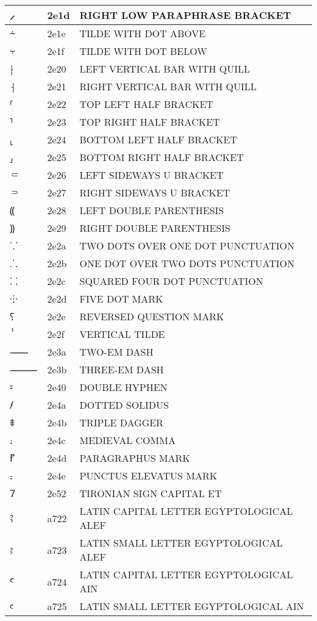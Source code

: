 \documentclass[12pt,letterpaper,openany]{book}
\begin{document}
\begin{center}
\begin{supertabular}{|m{0.25in}|m{0.5in}|m{4in}|}
⸝ & 2e1d & RIGHT LOW PARAPHRASE BRACKET\\\hline
⸞ & 2e1e & TILDE WITH DOT ABOVE\\\hline
⸟ & 2e1f & TILDE WITH DOT BELOW\\\hline
⸠ & 2e20 & LEFT VERTICAL BAR WITH QUILL\\\hline
⸡ & 2e21 & RIGHT VERTICAL BAR WITH QUILL\\\hline
⸢ & 2e22 & TOP LEFT HALF BRACKET\\\hline
⸣ & 2e23 & TOP RIGHT HALF BRACKET\\\hline
⸤ & 2e24 & BOTTOM LEFT HALF BRACKET\\\hline
⸥ & 2e25 & BOTTOM RIGHT HALF BRACKET\\\hline
⸦ & 2e26 & LEFT SIDEWAYS U BRACKET\\\hline
⸧ & 2e27 & RIGHT SIDEWAYS U BRACKET\\\hline
⸨ & 2e28 & LEFT DOUBLE PARENTHESIS\\\hline
⸩ & 2e29 & RIGHT DOUBLE PARENTHESIS\\\hline
⸪ & 2e2a & TWO DOTS OVER ONE DOT PUNCTUATION\\\hline
⸫ & 2e2b & ONE DOT OVER TWO DOTS PUNCTUATION\\\hline
⸬ & 2e2c & SQUARED FOUR DOT PUNCTUATION\\\hline
⸭ & 2e2d & FIVE DOT MARK\\\hline
⸮ & 2e2e & REVERSED QUESTION MARK\\\hline
ⸯ & 2e2f & VERTICAL TILDE\\\hline
⸺ & 2e3a & TWO-EM DASH\\\hline
⸻ & 2e3b & THREE-EM DASH\\\hline
⹀ & 2e40 & DOUBLE HYPHEN\\\hline
⹊ & 2e4a & DOTTED SOLIDUS\\\hline
⹋ & 2e4b & TRIPLE DAGGER\\\hline
⹌ & 2e4c & MEDIEVAL COMMA\\\hline
⹍ & 2e4d & PARAGRAPHUS MARK\\\hline
⹎ & 2e4e & PUNCTUS ELEVATUS MARK\\\hline
⹒ & 2e52 & TIRONIAN SIGN CAPITAL ET\\\hline
Ꜣ & a722 & LATIN CAPITAL LETTER EGYPTOLOGICAL ALEF\\\hline
ꜣ & a723 & LATIN SMALL LETTER EGYPTOLOGICAL ALEF\\\hline
Ꜥ & a724 & LATIN CAPITAL LETTER EGYPTOLOGICAL AIN\\\hline
ꜥ & a725 & LATIN SMALL LETTER EGYPTOLOGICAL AIN\\\hline

\end{supertabular}
\end{center}
\end{document}
